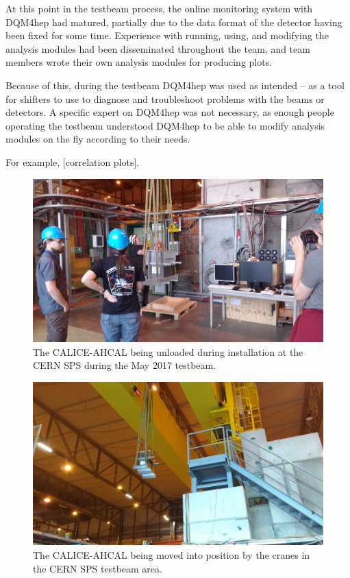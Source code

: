 At this point in the testbeam process, the online monitoring system with \acrshort{DQM4hep} had matured, partially due to the data format of the detector having been fixed for some time. Experience with running, using, and modifying the analysis modules had been disseminated throughout the team, and team members wrote their own analysis modules for producing plots.

Because of this, during the testbeam \acrshort{DQM4hep} was used as intended -- as a tool for shifters to use to diagnose and troubleshoot problems with the beams or detectors. A specific expert on \acrshort{DQM4hep} was not necessary, as enough people operating the testbeam understood \acrshort{DQM4hep} to be able to modify analysis modules on the fly according to their needs.

For example, [correlation plots].

\begin{figure}[p]
	\centering
	\includegraphics[width=1\textwidth]{../Pictures/AHCAL-CERN-2017-Installation-1.jpg}
	\caption{The \acrshort{CALICE}-\acrshort{AHCAL} being unloaded during installation at the \acrshort{CERN} \acrshort{SPS} during the May 2017 testbeam.}
	\label{figure:aida/may2017/installation-1}
\end{figure}

\begin{figure}[p]
	\centering
	\includegraphics[width=1\textwidth]{../Pictures/AHCAL-CERN-2017-Installation-2.jpg}
	\caption{The \acrshort{CALICE}-\acrshort{AHCAL} being moved into position by the cranes in the \acrshort{CERN} \acrshort{SPS} testbeam area.}
	\label{figure:aida/may2017/installation-2}
\end{figure}

